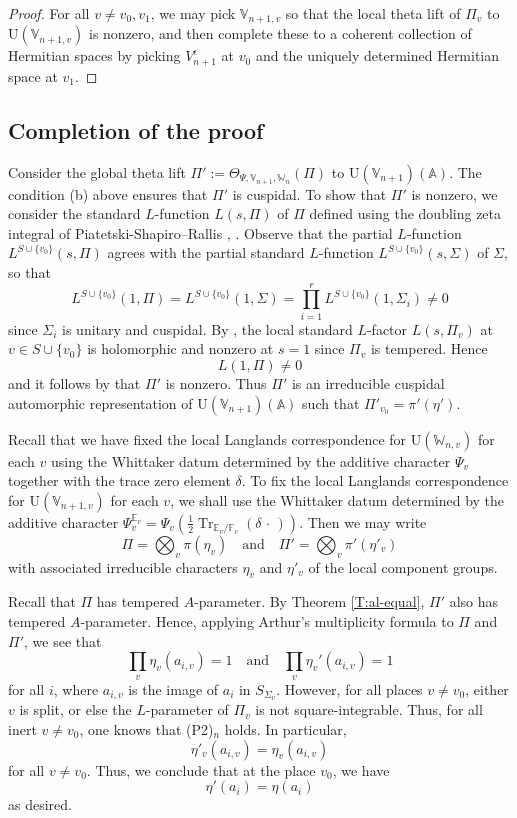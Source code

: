 \documentclass[11pt]{amsart}
\numberwithin{equation}{section}
\theoremstyle{plain}
\theoremstyle{definition}
\theoremstyle{remark}
\def\Tr{\operatorname{Tr}}
\def\U{\mathrm{U}}
\def\AA{\mathbb{A}}
\def\EE{\mathbb{E}}
\def\FF{\mathbb{F}}
\def\VV{\mathbb{V}}
\def\WW{\mathbb{W}}
\begin{document}
\begin{proof}
For all $v \ne v_0, v_1$, we may pick $\VV_{n+1, v}$ so that the local theta lift of $\Pi_v$ to $\U(\VV_{n+1, v})$ is nonzero, and then complete these to a coherent collection of Hermitian spaces by picking $V_{n+1}^\epsilon$ at $v_0$ and the uniquely determined Hermitian space at $v_1$. 
\end{proof}

\subsection{Completion of the proof}

Consider the global theta lift $\Pi' := \Theta_{\Psi, \VV_{n+1}, \WW_n}(\Pi)$ to $\U(\VV_{n+1})(\AA)$. The condition (b) above ensures that $\Pi'$ is cuspidal.
To show that $\Pi'$ is nonzero,
we consider the standard $L$-function $L(s, \Pi)$ of $\Pi$ defined using the doubling zeta integral of Piatetski-Shapiro--Rallis \cite{psr}, \cite{lr}.
Observe that the partial $L$-function $L^{S \cup \{v_0\}}(s, \Pi)$ agrees with the partial standard $L$-function $L^{S \cup \{v_0\}}(s, \Sigma)$ of $\Sigma$, so that 
\[  L^{S \cup \{v_0\}}(1, \Pi) = L^{S \cup \{v_0\}}(1, \Sigma) =  \prod_{i=1}^r  L^{S \cup \{v_0\}}(1, \Sigma_i) \ne 0 \]
since $\Sigma_i$ is unitary and cuspidal.
By \cite[Proposition 5]{lr}, the local standard $L$-factor $L(s, \Pi_v)$ at $v \in S \cup \{ v_0\}$ is holomorphic and nonzero at $s=1$ since $\Pi_v$ is tempered.
Hence
\[
 L(1, \Pi) \ne 0
\]
and it follows by \cite[Theorem 1.4]{gqt} that $\Pi'$ is nonzero.
Thus $\Pi'$ is an irreducible cuspidal automorphic representation of $\U(\VV_{n+1})(\AA)$ such that $\Pi'_{v_0}   = \pi'(\eta')$.

Recall that we have fixed the local Langlands correspondence for $\U(\WW_{n,v})$ for each $v$ using the Whittaker datum determined by the additive character $\Psi_v$ together with the trace zero element $\delta$.
To fix the local Langlands correspondence for $\U(\VV_{n+1,v})$ for each $v$, we shall use the Whittaker datum determined by the additive character $\Psi^{\EE_v}_v = \Psi_v(\frac{1}{2} \Tr_{\EE_v/\FF_v}(\delta \, \cdot \,))$.
Then we may write 
\[
 \Pi  = \bigotimes_v \pi(\eta_v) \quad \text{and} \quad
 \Pi' = \bigotimes_v \pi'(\eta'_v)
\]
with associated irreducible characters $\eta_v$ and $\eta'_v$ of the local component groups.

Recall that $\Pi$ has tempered $A$-parameter.
By Theorem \ref{T:al-equal}, $\Pi'$ also has tempered $A$-parameter.
Hence, applying Arthur's multiplicity formula \cite[Theorem 1.7.1]{kmsw} to $\Pi$ and $\Pi'$, we see that
\begin{equation}
\label{eq:arthur}
 \prod_v \eta_v(a_{i,v}) = 1 \quad \text{and} \quad \prod_v \eta_v'(a_{i,v}) = 1
\end{equation}
for all $i$, where $a_{i,v}$ is the image of $a_i$ in $S_{\Sigma_v}$.
However, for all places $v \ne v_0$, either $v$ is split, or else the $L$-parameter of $\Pi_v$ is not square-integrable. Thus, for all inert $v \ne v_0$, one knows that (P2)$_n$ holds. In particular,
\[  \eta'_v(a_{i,v})  =  \eta_v(a_{i,v})  \]
for all $v \ne v_0$.
Thus, we conclude that at the place $v_0$, we have
\[  \eta' (a_i)  = \eta(a_i)  \]
as desired. 
\end{document}
